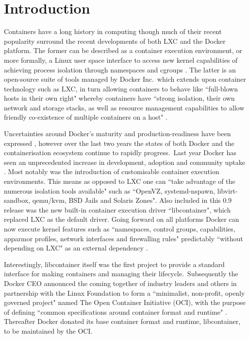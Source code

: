 \documentclass{article}
\begin{document}
\section{Introduction}
Containers have a long history in computing though much of their recent popularity 
surround the recent developments of both LXC and the Docker platform. 
The former can be described as a container execution environment,
or more formally, a Linux user space interface to 
access new kernel capabilities of achieving process isolation through namespaces
and cgroups \citep{Claus}. The latter is an open-source suite of tools managed by Docker Inc.\ which
extends upon container technology such as LXC, in turn 
allowing containers to behave like ``full-blown hosts in their own right" 
whereby containers have ``strong isolation, their own network and storage stacks, as well 
as resource management capabilities to allow friendly co-existence of multiple containers on a host" \citep{db}.
\par 
Uncertainties around Docker's maturity and production-readiness have been expressed \citep{Kereki, Powers, Merkel}, however 
over the last two years the states of both Docker and the containerisation ecosystem continue to rapidly progress.\
Last year Docker has seen an unprecedented increase in development, adoption and community uptake \citep{Merkel}. Most
notably was the introduction of customisable container execution environments. This means as opposed to LXC one can
``take advantage of the numerous isolation tools available" such as ``OpenVZ, systemd-nspawn, libvirt-sandbox, qemu/kvm, BSD Jails and Solaris Zones".
Also included in this 0.9 release was the new built-in container execution driver ``libcontainer", which replaced LXC as the default driver.
Going forward on all platforms Docker can now execute kernel features such as ``namespaces, control groups, capabilities, apparmor profiles, 
network interfaces and firewalling rules" predictably ``without depending on LXC" as an external dependency \citep{Hykes}. 
\par
Interestingly, libcontainer itself was the first project to provide a standard interface for making containers and managing their lifecycle.\
Subsequently the Docker CEO  announced the coming together of industry leaders and others in partnership with the Linux Foundation
to form a ``minimalist, non-profit, openly governed project" named The Open Container Initiative (OCI), with the purpose of defining 
``common specifications around container format and runtime" \citep{Golub}. 
Thereafter Docker donated its base container format and runtime, libcontainer, to be maintained by the OCI. 
\end{document}
